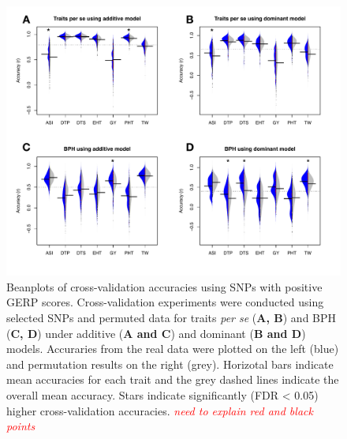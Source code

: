 \documentclass[twoside,twocolumn, letterpaper]{article}
\newcommand{\jri}[1]{\textcolor{red}{ \emph{ #1}} }
\begin{document}


\begin{figure}[htbp]
\centering
\includegraphics[width=\linewidth]{Figure_gerpall_m.pdf}
\caption{Beanplots of cross-validation accuracies using SNPs with positive GERP scores. Cross-validation experiments were conducted using selected SNPs and permuted data for traits \emph{per se} (\textbf{A, B}) and BPH (\textbf{C, D}) under additive (\textbf{A and C}) and dominant (\textbf{B and D}) models. Accuraries from the real data were plotted on the left (blue) and permutation results on the right (grey). Horizotal bars indicate mean accuracies for each trait and the grey dashed lines indicate the overall mean accuracy. Stars indicate significantly (FDR < 0.05) higher cross-validation accuracies.  \jri{need to explain red and black points}}
\label{fig:gerpall}
\end{figure}
\end{document}
